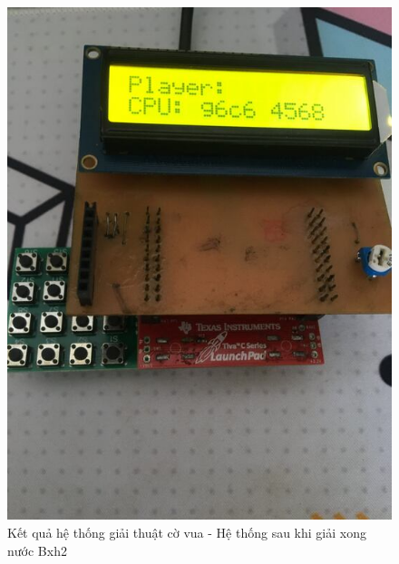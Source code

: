 \begin{figure}[ht]
\centering
\includegraphics[scale=0.4]{images/chess_end.jpg}
\caption{Kết quả hệ thống giải thuật cờ vua - Hệ thống sau khi giải xong nước Bxh2}
\label{fig:chess_end}
\end{figure}

